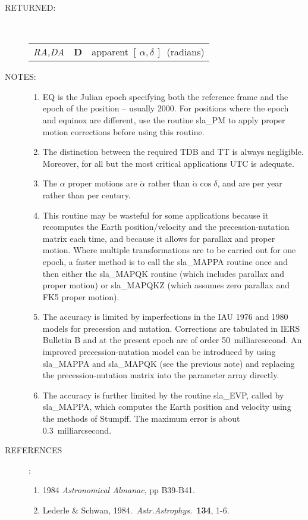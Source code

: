 \documentclass[11pt,twoside]{article}
\newcommand{\radec}     {$[\,\alpha,\delta\,]$}
\newlength{\oldspacing}
\newcommand{\args}[2]
{
  \goodbreak
  \setlength{\oldspacing}{\topsep}
  \setlength{\topsep}{0.3ex}
  \begin{description}
  \item[#1]:\\[1.5ex]
    \begin{tabular}{p{7em}p{6em}p{22em}}
      #2
    \end{tabular}
  \end{description}
  \setlength{\topsep}{\oldspacing}
}
\renewcommand{\args}[2]
   {
     \begin{description}
        \item[#1:]\\
        \begin{tabular}{p{7em}p{6em}l}
           #2
        \end{tabular}
     \end{description}
   }
\newcommand{\spec}[3]
{
  {\em {#1}} & {\bf \mbox{#2}} & {#3}
}
\newcommand{\notes}[1]
{
  \goodbreak
  \setlength{\oldspacing}{\topsep}
  \setlength{\topsep}{0.3ex}
  \begin{description}
    \item[NOTES]:
        #1
  \end{description}
  \setlength{\topsep}{\oldspacing}
}
\renewcommand{\notes}[1]
   {
      \begin{description}
         \item[NOTES:]
            #1
      \end{description}
   }
\newcommand{\refs}[1]
{
  \goodbreak
  \setlength{\oldspacing}{\topsep}
  \setlength{\topsep}{0.3ex}
  \begin{description}
    \item[REFERENCES]:
        #1
  \end{description}
  \setlength{\topsep}{\oldspacing}
}
\newcommand{\refs}[1]
   {
     \begin{description}
       \item[REFERENCES:]
           #1
     \end{description}
   }
\begin{document}
\args{RETURNED}
{
 \spec{RA,DA}{D}{apparent \radec\ (radians)}
}
\notes
{
 \begin{enumerate}
  \item EQ is the Julian epoch specifying both the reference
        frame and the epoch of the position -- usually 2000.
        For positions where the epoch and equinox are
        different, use the routine sla\_PM to apply proper
        motion corrections before using this routine.
  \item The distinction between the required TDB and TT is
        always negligible.  Moreover, for all but the most
        critical applications UTC is adequate.
  \item The $\alpha$ proper motions are $\dot{\alpha}$ rather than
        $\dot{\alpha}\cos\delta$, and are per year rather than per century.
  \item This routine may be wasteful for some applications
        because it recomputes the Earth position/velocity and
        the precession-nutation matrix each time, and because
        it allows for parallax and proper motion.  Where
        multiple transformations are to be carried out for one
        epoch, a faster method is to call the sla\_MAPPA routine
        once and then either the sla\_MAPQK routine (which includes
        parallax and proper motion) or sla\_MAPQKZ (which assumes
        zero parallax and FK5 proper motion).
  \item The accuracy is limited by imperfections in the IAU 1976
        and 1980 models for precession and nutation. Corrections
        are tabulated in IERS Bulletin B and at the present epoch
        are of order 50~milliarcsecond. An improved precession-nutation model
        can be introduced by using sla\_MAPPA and sla\_MAPQK (see
        the previous note) and replacing the precession-nutation
        matrix into the parameter array directly.
  \item The accuracy is further limited by the routine sla\_EVP, called
        by sla\_MAPPA, which computes the Earth position and
        velocity using the methods of Stumpff.  The maximum
        error is about 0.3~milliarcsecond.
 \end{enumerate}
}
\refs
{
 \begin{enumerate}
  \item 1984 {\it Astronomical Almanac}, pp B39-B41.
  \item Lederle \& Schwan, 1984.\ {\it Astr.Astrophys.}\ {\bf 134}, 1-6.
 \end{enumerate}
}
\end{document}
